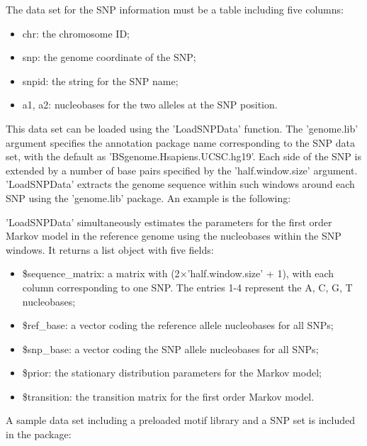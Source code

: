 \documentclass[a4paper,10pt]{article}
\begin{document}
The data set for the SNP information must be a table including five columns:

\begin{itemize}
\item chr: the chromosome ID;
\item snp: the genome coordinate of the SNP;
\item snpid: the string for the SNP name;
\item a1, a2: nucleobases for the two alleles at the SNP position.
\end{itemize}
  
This data set can be loaded using the 'LoadSNPData' function. The 'genome.lib' argument specifies the annotation package name corresponding to the SNP data set, with the default as 'BSgenome.Hsapiens.UCSC.hg19'. Each side of the SNP is extended by a number of base pairs specified by the 'half.window.size' argument. 'LoadSNPData' extracts the genome sequence within such windows around each SNP using the 'genome.lib' package. An example is the following:


'LoadSNPData' simultaneously estimates the parameters for the first order Markov model in the reference genome using the nucleobases within the SNP windows. It returns a list object with five fields:

\begin{itemize}
\item \$sequence\_matrix: a matrix with (2$\times$'half.window.size' + 1), with each column corresponding to one SNP. The entries 1-4 represent the A, C, G, T nucleobases;
\item \$ref\_base: a vector coding the reference allele nucleobases for all SNPs;
\item \$snp\_base: a vector coding the SNP allele nucleobases for all SNPs;
\item \$prior: the stationary distribution parameters for the Markov model;
\item \$transition: the transition matrix for the first order Markov model.
\end{itemize}

A sample data set including a preloaded motif library and a SNP set is included in the package:
\end{document}
